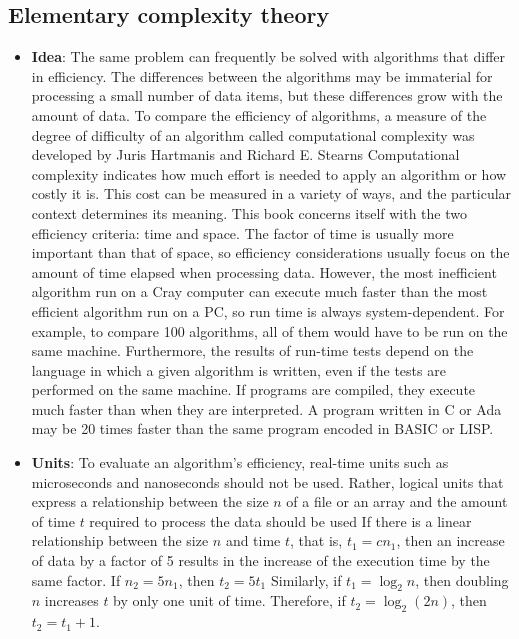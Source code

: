 \documentclass{report}
\begin{document}
   \subsection{Elementary complexity theory}
   \begin{itemize}
       \item \textbf{Idea}: The same problem can frequently be solved with algorithms that differ in efficiency. The differences between the algorithms may be immaterial for processing a small number of data items, but these differences grow with the amount of data. To compare the efficiency of algorithms, a measure of the degree of difficulty of an algorithm called computational complexity was developed by Juris Hartmanis and Richard E. Stearns
           \bigbreak \noindent 
           Computational complexity indicates how much effort is needed to apply an algorithm or how costly it is. This cost can be measured in a variety of ways, and the particular context determines its meaning. This book concerns itself with the two efficiency criteria: time and space. The factor of time is usually more important than that of space, so efficiency considerations usually focus on the amount of time elapsed when processing data. However, the most inefficient algorithm run on a Cray computer can execute much faster than the most efficient algorithm run on a PC, so run time is always system-dependent. For example, to compare 100 algorithms, all of them would have to be run on the same machine. Furthermore, the results of run-time tests depend on the language in which a given algorithm is written, even if the tests are performed on the same machine. If programs are compiled, they execute much faster than when they are interpreted. A program written in C or Ada may be 20 times faster than the same program encoded in BASIC or LISP.
        \item \textbf{Units}: To evaluate an algorithm’s efficiency, real-time units such as microseconds and nanoseconds should not be used. Rather, logical units that express a relationship between the size $n$ of a file or an array and the amount of time $t$ required to process the data should be used
            \bigbreak \noindent 
            If there is a linear relationship between the size $n$ and time $t$, that is, $t_{1} = cn_{1}$, then an increase of data by a factor of 5 results in the increase of the execution time by the same factor. If $n_{2} = 5n_{1}$, then $t_{2}= 5t_{1} $
            \bigbreak \noindent 
            Similarly, if $t_1 = \log_2 n$, then doubling $n$ increases $t$ by only one unit of time. Therefore, if $t_2 = \log_2(2n)$, then $t_2 = t_1 + 1$.

\end{itemize}
\end{document}
